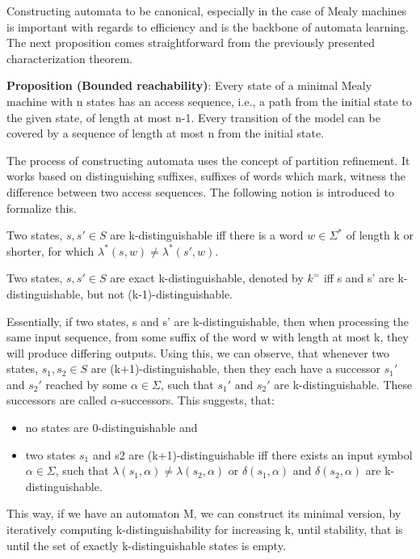 Constructing automata to be canonical, especially in the case of Mealy machines is important with regards to efficiency and is the backbone of automata learning. The next proposition comes straightforward from the previously presented characterization theorem.


\noindent \textbf{Proposition (Bounded reachability\cite{Steffen2011})}: Every state of a minimal Mealy machine with n states has an access sequence, i.e., a path from the initial state to the given state,  of  length  at  most n-1.  Every  transition  of the model can be covered by a sequence of length at most n from the initial state.

The process of constructing automata uses the concept of partition refinement. It works based on distinguishing suffixes, suffixes of words which mark, witness the difference between two access sequences. The following notion is introduced to formalize this.


\begin{definition}
	Two states, $s,s'\in S$ are k-distinguishable iff there is a word $w\in\Sigma^*$ of length k or shorter, for which $\lambda^*(s, w)\neq\lambda^*(s',w)$.
\end{definition} 

\begin{definition}
	Two states, $s,s'\in S$ are exact k-distinguishable, denoted by $k^=$ iff s and s' are k-distinguishable, but not (k-1)-distinguishable.
\end{definition}

Essentially, if two states, s and s' are  k-distinguishable, then when processing the same input sequence, from some suffix of the word w with length at most k, they will produce differing outputs. Using this, we can observe, that whenever two states, $s_1, s_2\in S$ are (k+1)-distinguishable, then they each have a successor $s_1'$ and $s_2'$ reached by some $\alpha\in\Sigma$, such that $s_1'$ and $s_2'$ are k-distinguishable. These successors are called $\alpha$-successors. This suggests, that:
\begin{itemize}
	\item no states are 0-distinguishable and
	\item two states $s_1$ and s2 are (k+1)-distinguishable iff there exists an input symbol $\alpha\in\Sigma$, such that $\lambda(s_1, \alpha) \neq \lambda(s_2,\alpha)$ or $\delta(s_1, \alpha)$ and $\delta(s_2, \alpha)$ are k-distinguishable.\cite{Steffen2011}
\end{itemize}
This way, if we have an automaton M, we can construct its minimal version, by iteratively computing k-distinguishability for increasing k, until stability, that is until the set of exactly k-distinguishable states is empty.

